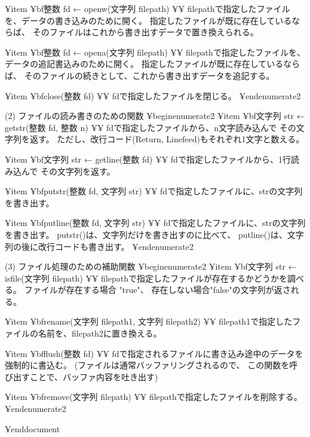 ¥item {¥bf{整数 fd ← openw(文字列 filepath)}} ¥¥
	filepathで指定したファイルを、データの書き込みのために開く。
	指定したファイルが既に存在しているならば、
        そのファイルはこれから書き出すデータで置き換えられる。

¥item {¥bf{整数 fd ← opena(文字列 filepath)}} ¥¥
	filepathで指定したファイルを、データの追記書込みのために開く。
	指定したファイルが既に存在しているならば、
        そのファイルの続きとして、これから書き出すデータを追記する。

¥item {¥bf{close(整数 fd)}} ¥¥
	fdで指定したファイルを閉じる。
¥end{enumerate2}

(2) ファイルの読み書きのための関数 
¥begin{enumerate2}
¥item {¥bf{文字列 str ← getstr(整数 fd, 整数 n)}} ¥¥
	fdで指定したファイルから、n文字読み込んで その文字列を返す。
        ただし、改行コード(Return, Linefeed)もそれぞれ1文字と数える。

¥item {¥bf{文字列 str ← getline(整数 fd)}} ¥¥
	fdで指定したファイルから、1行読み込んで その文字列を返す。

¥item {¥bf{putstr(整数 fd, 文字列 str)}} ¥¥
	fdで指定したファイルに、strの文字列を書き出す。

¥item {¥bf{putline(整数 fd, 文字列 str)}} ¥¥
	fdで指定したファイルに、strの文字列を書き出す。
	putstr()は、文字列だけを書き出すのに比べて、
	putline()は、文字列の後に改行コードも書き出す。
¥end{enumerate2}

(3) ファイル処理のための補助関数 
¥begin{enumerate2}
¥item {¥bf{文字列 str ← isfile(文字列 filepath)}} ¥¥
	filepathで指定したファイルが存在するかどうかを調べる。
	ファイルが存在する場合 "true"、 
        存在しない場合"false"の文字列が返される。

¥item {¥bf{rename(文字列 filepath1, 文字列 filepath2)}} ¥¥
	filepath1で指定したファイルの名前を、filepath2に置き換える。

¥item {¥bf{flush(整数 fd)}} ¥¥
	fdで指定されるファイルに書き込み途中のデータを強制的に書込む。
        (ファイルは通常バッファリングされるので、
	この関数を呼び出すことで、バッファ内容を吐き出す) 

¥item {¥bf{remove(文字列 filepath)}} ¥¥
	filepathで指定したファイルを削除する。
¥end{enumerate2}

¥end{document}

